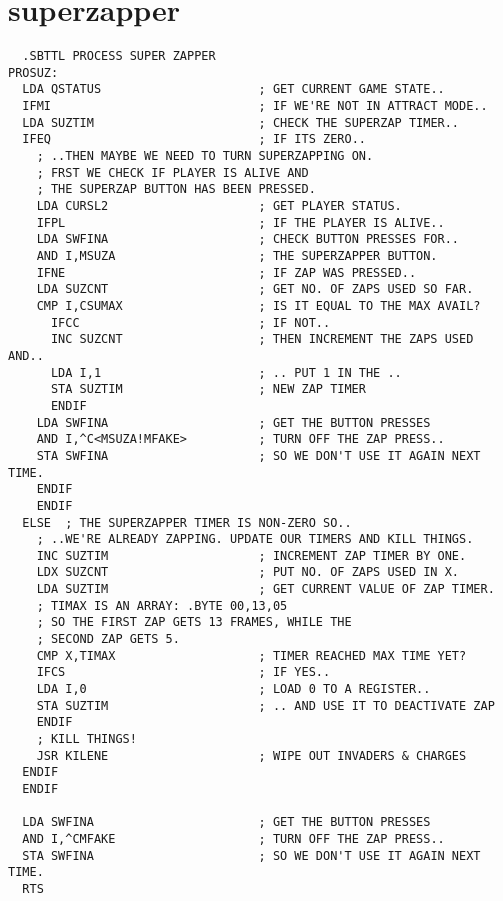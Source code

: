 \chapter{superzapper}
\lhead[tempest]{}
\label{sec:if}
\lstset{style=6502Style}


\begin{lstlisting}
  .SBTTL PROCESS SUPER ZAPPER
PROSUZ:
  LDA QSTATUS                      ; GET CURRENT GAME STATE..
  IFMI                             ; IF WE'RE NOT IN ATTRACT MODE..
  LDA SUZTIM                       ; CHECK THE SUPERZAP TIMER..
  IFEQ                             ; IF ITS ZERO..
    ; ..THEN MAYBE WE NEED TO TURN SUPERZAPPING ON.
    ; FRST WE CHECK IF PLAYER IS ALIVE AND
    ; THE SUPERZAP BUTTON HAS BEEN PRESSED.
    LDA CURSL2                     ; GET PLAYER STATUS.
    IFPL                           ; IF THE PLAYER IS ALIVE..
    LDA SWFINA                     ; CHECK BUTTON PRESSES FOR..
    AND I,MSUZA                    ; THE SUPERZAPPER BUTTON.
    IFNE                           ; IF ZAP WAS PRESSED..
    LDA SUZCNT                     ; GET NO. OF ZAPS USED SO FAR.
    CMP I,CSUMAX                   ; IS IT EQUAL TO THE MAX AVAIL?
      IFCC                         ; IF NOT..
      INC SUZCNT                   ; THEN INCREMENT THE ZAPS USED AND..
      LDA I,1                      ; .. PUT 1 IN THE ..
      STA SUZTIM                   ; NEW ZAP TIMER
      ENDIF
    LDA SWFINA                     ; GET THE BUTTON PRESSES
    AND I,^C<MSUZA!MFAKE>          ; TURN OFF THE ZAP PRESS..
    STA SWFINA                     ; SO WE DON'T USE IT AGAIN NEXT TIME.
    ENDIF
    ENDIF
  ELSE  ; THE SUPERZAPPER TIMER IS NON-ZERO SO.. 
    ; ..WE'RE ALREADY ZAPPING. UPDATE OUR TIMERS AND KILL THINGS.
    INC SUZTIM                     ; INCREMENT ZAP TIMER BY ONE.
    LDX SUZCNT                     ; PUT NO. OF ZAPS USED IN X.
    LDA SUZTIM                     ; GET CURRENT VALUE OF ZAP TIMER.
    ; TIMAX IS AN ARRAY: .BYTE 00,13,05
    ; SO THE FIRST ZAP GETS 13 FRAMES, WHILE THE
    ; SECOND ZAP GETS 5.
    CMP X,TIMAX                    ; TIMER REACHED MAX TIME YET?
    IFCS                           ; IF YES..
    LDA I,0                        ; LOAD 0 TO A REGISTER..
    STA SUZTIM                     ; .. AND USE IT TO DEACTIVATE ZAP
    ENDIF
    ; KILL THINGS!
    JSR KILENE                     ; WIPE OUT INVADERS & CHARGES
  ENDIF
  ENDIF
    
  LDA SWFINA                       ; GET THE BUTTON PRESSES
  AND I,^CMFAKE                    ; TURN OFF THE ZAP PRESS..
  STA SWFINA                       ; SO WE DON'T USE IT AGAIN NEXT TIME.
  RTS
\end{lstlisting}

